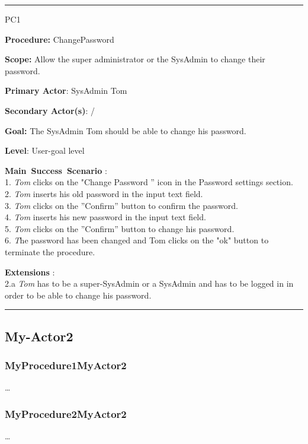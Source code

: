 \hrule
\vspace{0.5cm}
\begin{lyxlist}{PC1}
\small{
\item [\textbf{Procedure:}] ChangePassword 
\item [\textbf{Scope:}] Allow the super administrator or the SysAdmin to change
their password.
\item [\textbf{Primary Actor}:] SysAdmin Tom
\item [\textbf{Secondary Actor(s)}:] /
\item [\textbf{Goal:}] The SysAdmin Tom should be able to change his password.
\item [\textbf{Level}:] User-goal level
\item [\textbf{Main~Success~Scenario}]:\\
1. \emph{Tom} clicks on the "Change Password '' icon in the Password settings
section.\\
2. \emph{Tom} inserts his old password in the input text field.\\
3. \emph{Tom} clicks on the ''Confirm'' button to confirm the password.\\
4. \emph{Tom} inserts his new password in the input text field.\\
5. \emph{Tom} clicks on the ''Confirm'' button to change his password.\\
6. \emph The password has been changed and {Tom} clicks on the "ok" button
to terminate the procedure.\\

\item [\textbf{Extensions}]:\\
2.a \emph{Tom} has to be a super-SysAdmin or a SysAdmin and has to be logged in
in order to be able to change his password.\\
}
\end{lyxlist}
\hrule




\subsection{My-Actor2}

\subsubsection{MyProcedure1MyActor2}
\ldots

\subsubsection{MyProcedure2MyActor2}
\ldots














